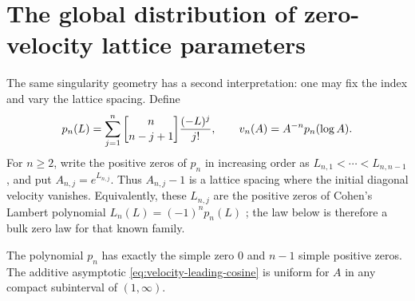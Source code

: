 \section{The global distribution of zero-velocity lattice parameters}
\label{sec:velocity-zero-law}

The same singularity geometry has a second interpretation: one may fix
the index and vary the lattice spacing.  Define
\[
 p_n(L)=\sum_{j=1}^n\stirling{n}{n-j+1}\frac{(-L)^j}{j!},
 \qquad v_n(A)=A^{-n}p_n(\log A).
\]
For $n\geq2$, write the positive zeros of $p_n$ in increasing order as
$L_{n,1}<\cdots<L_{n,n-1}$, and put $A_{n,j}=e^{L_{n,j}}$.
Thus $A_{n,j}-1$ is a lattice spacing where the initial diagonal
velocity vanishes.  Equivalently, these $L_{n,j}$ are the positive
zeros of Cohen's Lambert polynomial $L_n(L)=(-1)^np_n(L)$
\cite[Proposition~4.8]{Cohen2021}; the law below is therefore a bulk
zero law for that known family.

\begin{lemma}
\label{lem:zero-law-inputs}
The polynomial $p_n$ has exactly the simple zero $0$ and $n-1$ simple
positive zeros.  The additive asymptotic
\eqref{eq:velocity-leading-cosine} is uniform for $A$ in any compact
subinterval of $(1,\infty)$.
\end{lemma}

